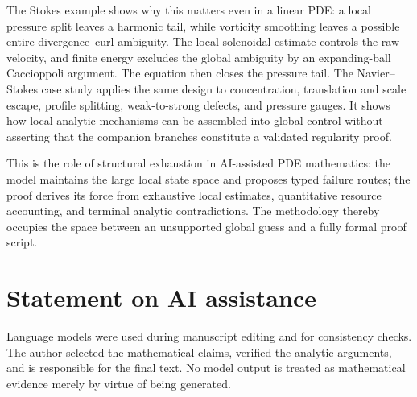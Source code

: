 \documentclass[11pt,reqno]{amsart}
\theoremstyle{plain}
\theoremstyle{definition}
\theoremstyle{remark}
\numberwithin{equation}{section}
\begin{document}
The Stokes example shows why this matters even in a linear PDE: a local
pressure split leaves a harmonic tail, while vorticity smoothing leaves a
possible entire divergence--curl ambiguity.  The local solenoidal estimate
controls the raw velocity, and finite energy excludes the global ambiguity by
an expanding-ball Caccioppoli argument.  The equation then closes the pressure
tail.  The Navier--Stokes case study applies the same design to
concentration, translation and scale escape, profile splitting,
weak-to-strong defects, and pressure gauges.  It shows how local analytic
mechanisms can be assembled into global control without asserting that the
companion branches constitute a validated regularity proof.

This is the role of structural exhaustion in AI-assisted PDE mathematics: the
model maintains the large local state space and proposes typed failure routes;
the proof derives its force from exhaustive local estimates, quantitative
resource accounting, and terminal analytic contradictions.  The methodology
thereby occupies the space between an unsupported global guess and a fully
formal proof script.

\section*{Statement on AI assistance}

Language models were used during manuscript editing and for consistency checks.
The author selected the mathematical claims, verified the analytic arguments,
and is responsible for the final text.  No model output is treated as
mathematical evidence merely by virtue of being generated.



\end{document}
